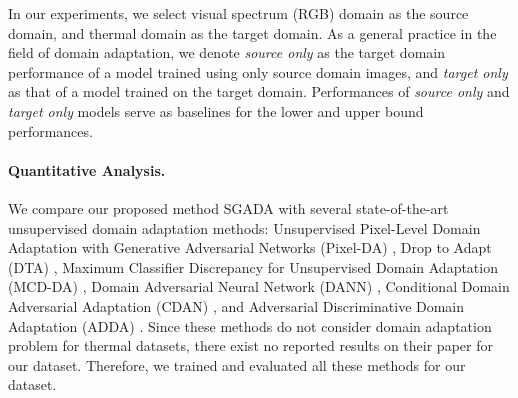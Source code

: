 \documentclass[final]{cvpr}
\begin{document}
In our experiments, we select visual spectrum (RGB) domain as the source domain, and thermal domain as the target domain. As a general practice in the field of domain adaptation, we denote \textit{source only} as the target domain performance of a model trained using only source domain images, and \textit{target only} as that of a model trained on the target domain. Performances of \textit{source only} and \textit{target only} models serve as baselines for the lower and upper bound performances.

\begin{table}[ht]
\renewcommand{\arraystretch}{1.3}
\caption{Per-class classification performance comparison.}
\label{table:results}
\vspace{3mm}
\centering
{}
\end{table}

\paragraph{Quantitative Analysis.} We compare our proposed method SGADA with several state-of-the-art unsupervised domain adaptation methods: Unsupervised Pixel-Level Domain Adaptation with Generative Adversarial Networks (Pixel-DA) \cite{pixelda}, Drop to Adapt (DTA) \cite{dta}, Maximum Classifier Discrepancy for Unsupervised Domain Adaptation (MCD-DA) \cite{mcdda}, Domain Adversarial Neural Network (DANN) \cite{dann}, Conditional Domain Adversarial Adaptation (CDAN) \cite{cdan}, and Adversarial Discriminative Domain Adaptation (ADDA) \cite{adda}. Since these methods do not consider domain adaptation problem for thermal datasets, there exist no reported results on their paper for our dataset. Therefore, we trained and evaluated all these methods for our dataset. 
\vspace{2mm}
\end{document}
